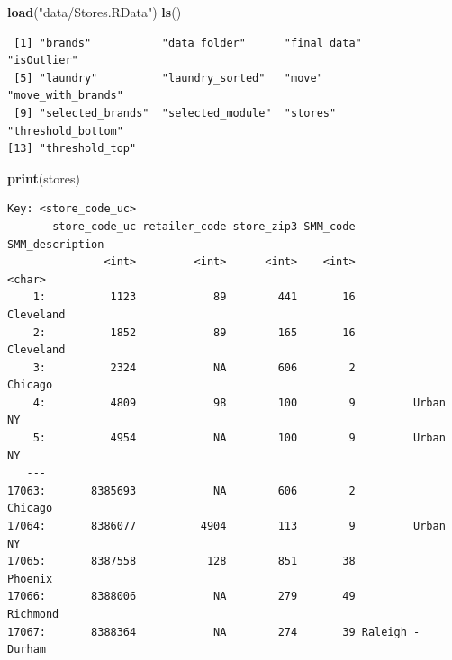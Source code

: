 \documentclass[
]{article}
\newenvironment{Shaded}{\begin{snugshade}}{\end{snugshade}}
\newcommand{\AttributeTok}[1]{\textcolor[rgb]{0.13,0.29,0.53}{#1}}
\newcommand{\ConstantTok}[1]{\textcolor[rgb]{0.56,0.35,0.01}{#1}}
\newcommand{\FunctionTok}[1]{\textcolor[rgb]{0.13,0.29,0.53}{\textbf{#1}}}
\newcommand{\NormalTok}[1]{#1}
\newcommand{\OtherTok}[1]{\textcolor[rgb]{0.56,0.35,0.01}{#1}}
\newcommand{\SpecialCharTok}[1]{\textcolor[rgb]{0.81,0.36,0.00}{\textbf{#1}}}
\newcommand{\StringTok}[1]{\textcolor[rgb]{0.31,0.60,0.02}{#1}}
\begin{document}
\begin{Shaded}
\begin{Highlighting}[]
\FunctionTok{load}\NormalTok{(}\StringTok{"data/Stores.RData"}\NormalTok{)}
\FunctionTok{ls}\NormalTok{() }
\end{Highlighting}
\end{Shaded}

\begin{verbatim}
 [1] "brands"           "data_folder"      "final_data"       "isOutlier"       
 [5] "laundry"          "laundry_sorted"   "move"             "move_with_brands"
 [9] "selected_brands"  "selected_module"  "stores"           "threshold_bottom"
[13] "threshold_top"   
\end{verbatim}

\begin{Shaded}
\begin{Highlighting}[]
\FunctionTok{print}\NormalTok{(stores)   }
\end{Highlighting}
\end{Shaded}

\begin{verbatim}
Key: <store_code_uc>
       store_code_uc retailer_code store_zip3 SMM_code  SMM_description
               <int>         <int>      <int>    <int>           <char>
    1:          1123            89        441       16        Cleveland
    2:          1852            89        165       16        Cleveland
    3:          2324            NA        606        2          Chicago
    4:          4809            98        100        9         Urban NY
    5:          4954            NA        100        9         Urban NY
   ---                                                                 
17063:       8385693            NA        606        2          Chicago
17064:       8386077          4904        113        9         Urban NY
17065:       8387558           128        851       38          Phoenix
17066:       8388006            NA        279       49         Richmond
17067:       8388364            NA        274       39 Raleigh - Durham
\end{verbatim}

\begin{Shaded}
\end{Shaded}
\end{document}
